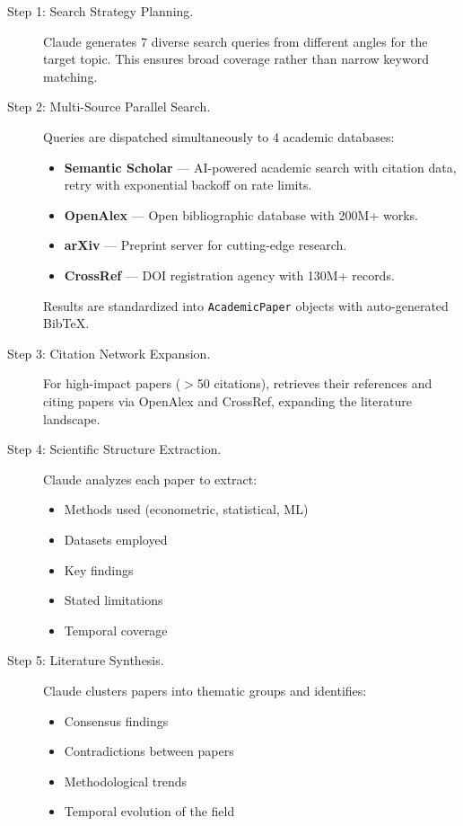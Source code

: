 \begin{description}
  \item[Step 1: Search Strategy Planning.] Claude generates 7 diverse search queries from different angles for the target topic. This ensures broad coverage rather than narrow keyword matching.

  \item[Step 2: Multi-Source Parallel Search.] Queries are dispatched simultaneously to 4 academic databases:
  \begin{itemize}
    \item \textbf{Semantic Scholar} --- AI-powered academic search with citation data, retry with exponential backoff on rate limits.
    \item \textbf{OpenAlex} --- Open bibliographic database with 200M+ works.
    \item \textbf{arXiv} --- Preprint server for cutting-edge research.
    \item \textbf{CrossRef} --- DOI registration agency with 130M+ records.
  \end{itemize}
  Results are standardized into \texttt{AcademicPaper} objects with auto-generated BibTeX.

  \item[Step 3: Citation Network Expansion.] For high-impact papers ($>$50 citations), \gauss retrieves their references and citing papers via OpenAlex and CrossRef, expanding the literature landscape.

  \item[Step 4: Scientific Structure Extraction.] Claude analyzes each paper to extract:
  \begin{itemize}
    \item Methods used (econometric, statistical, ML)
    \item Datasets employed
    \item Key findings
    \item Stated limitations
    \item Temporal coverage
  \end{itemize}

  \item[Step 5: Literature Synthesis.] Claude clusters papers into thematic groups and identifies:
  \begin{itemize}
    \item Consensus findings
    \item Contradictions between papers
    \item Methodological trends
    \item Temporal evolution of the field
  \end{itemize}


\end{description}
